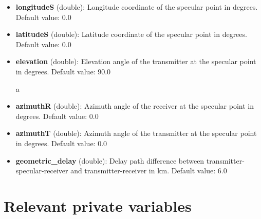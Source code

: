 \begin{itemize}
\item {\bf longitudeS} (double): Longitude coordinate of the specular point in degrees. Default value: 0.0

\item {\bf latitudeS} (double): Latitude coordinate of the specular point in degrees. Default value: 0.0

\item {\bf elevation} (double): Elevation angle of the transmitter at the specular point in degrees. Default value: 90.0

a\item {\bf azimuthR} (double): Azimuth angle of the receiver at the specular point in degrees. Default value: 0.0

\item {\bf azimuthT} (double): Azimuth angle of the transmitter at the specular point in degrees. Default value: 0.0

\item {\bf geometric\_delay} (double): Delay path difference between transmitter-specular-receiver and transmitter-receiver in km. Default value: 6.0
\end{itemize}

\section{Relevant private variables}

